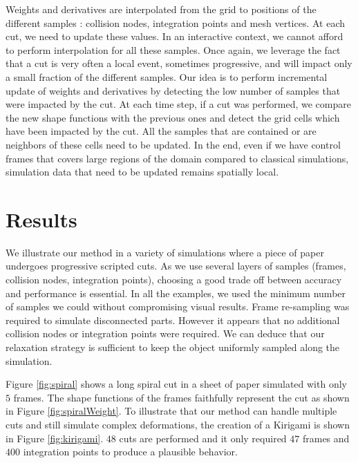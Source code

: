 Weights and derivatives are interpolated from the grid to positions of the different samples : collision nodes, integration points and mesh vertices. At each cut, we need to update these values. In an interactive context, we cannot afford to perform interpolation for all these samples. Once again, we leverage the fact that a cut is very often a local event, sometimes progressive, and will impact only a small fraction of the different samples. Our idea is to perform incremental update of weights and derivatives by detecting the low number of samples that were impacted by the cut. At each time step, if a cut was performed, we compare the new shape functions with the previous ones and detect the grid cells which have been impacted by the cut. All the samples that are contained or are neighbors of these cells need to be updated. In the end, even if we have control frames that covers large regions of the domain compared to classical simulations, simulation data that need to be updated remains spatially local.

\section{Results} \label{sec:results}

We illustrate our method in a variety of simulations where a piece of paper undergoes progressive scripted cuts. As we use several layers of samples (frames, collision nodes, integration points), choosing a good trade off between accuracy and performance is essential. In all the examples, we used the minimum number of samples we could without compromising visual results. Frame re-sampling was required to simulate disconnected parts. However it appears that no additional collision nodes or integration points were required. We can deduce that our relaxation strategy is sufficient to keep the object uniformly sampled along the simulation. 

Figure \ref{fig:spiral} shows a long spiral cut in a sheet of paper simulated with only $5$ frames. The shape functions of the frames faithfully represent the cut as shown in Figure \ref{fig:spiralWeight}. 
To illustrate that our method can handle multiple cuts and still simulate complex deformations, the creation of a Kirigami is shown in Figure \ref{fig:kirigami}. $48$ cuts are performed and it only required $47$ frames and $400$ integration points to produce a plausible behavior.

